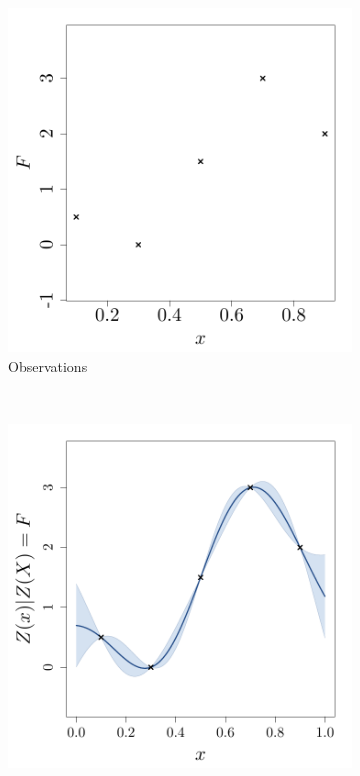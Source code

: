 \documentclass[twoside,openright]{report}
\begin{document}
\begin{figure}[ht!]
        \centering
        \begin{subfigure}[t]{0.3\textwidth}
                \includegraphics[width=\textwidth]{figures/ch2_obs}
                \caption{Observations}
        \end{subfigure}%
        ~         
        \begin{subfigure}[t]{0.3\textwidth}
                \includegraphics[width=\textwidth]{figures/ch2_GPR}

\end{subfigure}
\end{figure}
\end{document}
